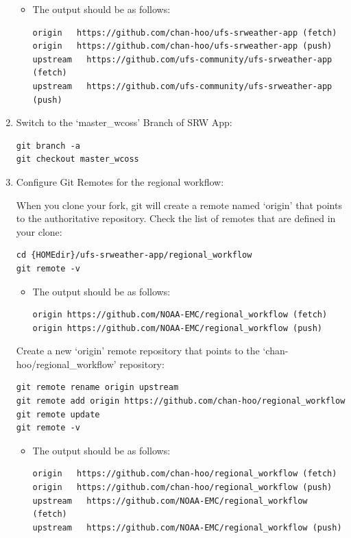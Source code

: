 \documentclass[11pt,fleqn]{report}              %
\begin{document}
\begin{enumerate}
\begin{itemize}
\item The output should be as follows:
\lstset{language=bash}   
\begin{lstlisting}[frame=trBL]
origin   https://github.com/chan-hoo/ufs-srweather-app (fetch)
origin   https://github.com/chan-hoo/ufs-srweather-app (push)
upstream   https://github.com/ufs-community/ufs-srweather-app (fetch)
upstream   https://github.com/ufs-community/ufs-srweather-app (push)
\end{lstlisting}
\end{itemize}

\item Switch to the `master\_wcoss' Branch of SRW App:

\lstset{language=bash}   
\begin{lstlisting}[frame=trBL]
git branch -a
git checkout master_wcoss
\end{lstlisting}


\item Configure Git Remotes for the regional workflow:

When you clone your fork, git will create a remote named `origin' that points to the authoritative repository. Check the list of remotes that are defined in your clone:
\lstset{language=bash}   
\begin{lstlisting}[frame=trBL]
cd {HOMEdir}/ufs-srweather-app/regional_workflow
git remote -v
\end{lstlisting}

\begin{itemize}
\item The output should be as follows:
\lstset{language=bash}   
\begin{lstlisting}[frame=trBL]
origin https://github.com/NOAA-EMC/regional_workflow (fetch)
origin https://github.com/NOAA-EMC/regional_workflow (push)
\end{lstlisting}
\end{itemize}

Create a new `origin' remote repository that points to the `chan-hoo/regional\_workflow' repository:
\lstset{language=bash}   
\begin{lstlisting}[frame=trBL]
git remote rename origin upstream
git remote add origin https://github.com/chan-hoo/regional_workflow
git remote update
git remote -v
\end{lstlisting}

\begin{itemize}
\item The output should be as follows:
\lstset{language=bash}   
\begin{lstlisting}[frame=trBL]
origin   https://github.com/chan-hoo/regional_workflow (fetch)
origin   https://github.com/chan-hoo/regional_workflow (push)
upstream   https://github.com/NOAA-EMC/regional_workflow (fetch)
upstream   https://github.com/NOAA-EMC/regional_workflow (push)
\end{lstlisting}
\end{itemize}


\end{enumerate}
\end{document}
